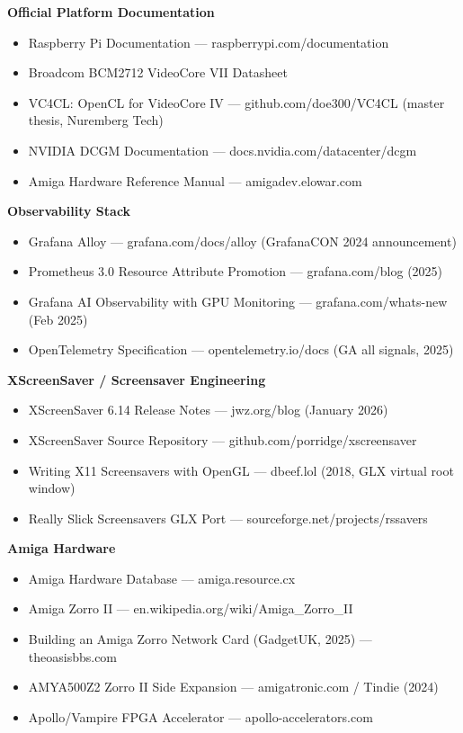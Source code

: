 \documentclass[11pt,letterpaper]{article}
\begin{document}
\textbf{Official Platform Documentation}
\begin{itemize}[noitemsep]
  \item Raspberry Pi Documentation — raspberrypi.com/documentation
  \item Broadcom BCM2712 VideoCore VII Datasheet
  \item VC4CL: OpenCL for VideoCore IV — github.com/doe300/VC4CL (master thesis, Nuremberg Tech)
  \item NVIDIA DCGM Documentation — docs.nvidia.com/datacenter/dcgm
  \item Amiga Hardware Reference Manual — amigadev.elowar.com
\end{itemize}

\textbf{Observability Stack}
\begin{itemize}[noitemsep]
  \item Grafana Alloy — grafana.com/docs/alloy (GrafanaCON 2024 announcement)
  \item Prometheus 3.0 Resource Attribute Promotion — grafana.com/blog (2025)
  \item Grafana AI Observability with GPU Monitoring — grafana.com/whats-new (Feb 2025)
  \item OpenTelemetry Specification — opentelemetry.io/docs (GA all signals, 2025)
\end{itemize}

\textbf{XScreenSaver / Screensaver Engineering}
\begin{itemize}[noitemsep]
  \item XScreenSaver 6.14 Release Notes — jwz.org/blog (January 2026)
  \item XScreenSaver Source Repository — github.com/porridge/xscreensaver
  \item Writing X11 Screensavers with OpenGL — dbeef.lol (2018, GLX virtual root window)
  \item Really Slick Screensavers GLX Port — sourceforge.net/projects/rssavers
\end{itemize}

\textbf{Amiga Hardware}
\begin{itemize}[noitemsep]
  \item Amiga Hardware Database — amiga.resource.cx
  \item Amiga Zorro II — en.wikipedia.org/wiki/Amiga\_Zorro\_II
  \item Building an Amiga Zorro Network Card (GadgetUK, 2025) — theoasisbbs.com
  \item AMYA500Z2 Zorro II Side Expansion — amigatronic.com / Tindie (2024)
  \item Apollo/Vampire FPGA Accelerator — apollo-accelerators.com
\end{itemize}
\end{document}
